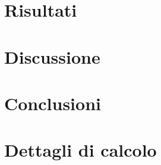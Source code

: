 \documentclass[11pt,a4paper]{article}
\begin{document}
\section{Risultati}

\section{Discussione}

\section{Conclusioni}

\appendix
\section{Dettagli di calcolo}


\end{document}
